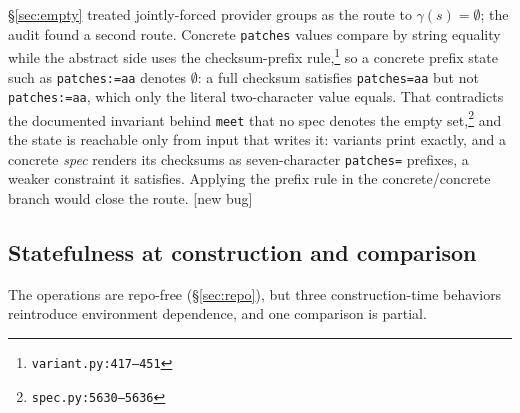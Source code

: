\documentclass[11pt]{article}
\theoremstyle{definition}
\theoremstyle{remark}
\newcommand{\den}[1]{\gamma(#1)}
\newcommand{\code}[1]{\texttt{#1}}
\newcommand{\src}[1]{\footnote{\code{#1}}}
\begin{document}
\S\ref{sec:empty} treated jointly-forced provider groups as the route to
$\den{s} = \emptyset$; the audit found a second route.  Concrete
\code{patches} values compare by string equality while the abstract side uses
the checksum-prefix rule,\src{variant.py:417--451} so a concrete prefix state
such as \code{patches:=aa} denotes $\emptyset$: a full checksum satisfies
\code{patches=aa} but not \code{patches:=aa}, which only the literal
two-character value equals.  That contradicts the documented invariant behind
\code{meet} that no spec denotes the empty set,\src{spec.py:5630--5636} and
the state is reachable only from input that writes it: variants print
exactly, and a concrete \emph{spec} renders its checksums as seven-character
\code{patches=} prefixes, a weaker constraint it satisfies.  Applying the
prefix rule in the concrete/concrete branch would close the route.  [new
bug]

\subsection{Statefulness at construction and comparison}\label{sec:audit-state}

The operations are repo-free (\S\ref{sec:repo}), but three construction-time
behaviors reintroduce environment dependence, and one comparison is partial.
\end{document}
